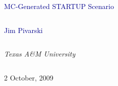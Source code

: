 \documentclass[compress]{beamer}
\begin{document}
\begin{frame}
\vfill
\begin{center}
\textcolor{darkblue}{\Large MC-Generated STARTUP Scenario}

\vfill
\begin{columns}
\begin{center}
\large
\textcolor{darkblue}{Jim Pivarski}
\end{center}
\end{columns}

\begin{columns}
\begin{center}
\scriptsize
{\it Texas A\&M University}
\end{center}
\end{columns}

\vfill
2 October, 2009

\end{center}
\end{frame}


\small
\end{document}
